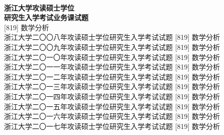 \documentclass[UTF8,a4paper,11pt]{article}
\begin{document}
\renewcommand{\headrulewidth}{0pt}
\pagestyle{fancy}
\newcommand{\sh}{\mathrm{sh}}
\renewcommand{\Im}{\mathrm{Im}}
\newcommand{\rank}{\mathrm{rank}}
\renewcommand{\i}{\mathrm{i}}
\newcommand{\e}{\mathrm{e}}
\newcommand{\ud}[1]{\mathrm{d}#1}
\newcommand{\sgn}{\mathrm{sgn}}
\renewcommand{\emptyset}{\varnothing}
\setlength{\fboxsep}{8pt}
\fancypage{\fbox}{}
\begin{center}
	\mbox{}\\
	{\Huge\bf 浙江大学攻读硕士学位\\
		研究生入学考试业务课试题\\}
	{\huge [819] 数学分析}\\
	浙江大学二〇〇八年攻读硕士学位研究生入学考试试题 [819] 数学分析\\
	浙江大学二〇〇九年攻读硕士学位研究生入学考试试题 [819] 数学分析\\
	浙江大学二〇一〇年攻读硕士学位研究生入学考试试题 [819] 数学分析\\
	浙江大学二〇一一年攻读硕士学位研究生入学考试试题 [819] 数学分析\\
	浙江大学二〇一二年攻读硕士学位研究生入学考试试题 [819] 数学分析\\
	浙江大学二〇一三年攻读硕士学位研究生入学考试试题 [819] 数学分析\\
	浙江大学二〇一四年攻读硕士学位研究生入学考试试题 [819] 数学分析\\
	浙江大学二〇一五年攻读硕士学位研究生入学考试试题 [819] 数学分析\\
	浙江大学二〇一六年攻读硕士学位研究生入学考试试题 [819] 数学分析\\
	浙江大学二〇一七年攻读硕士学位研究生入学考试试题 [819] 数学分析\\
	\mbox{}
\end{center}
\newpage
\end{document}
